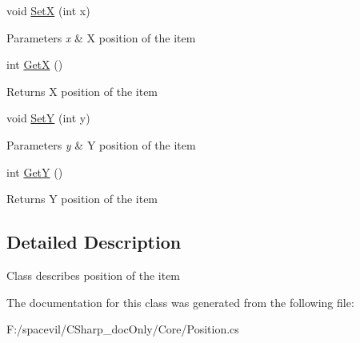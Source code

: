 \begin{DoxyCompactItemize}
\item 
\mbox{\label{class_space_v_i_l_1_1_core_1_1_position_a36efdbd80c4028b3aaff4a289e6fccbf}} 
void \mbox{\hyperlink{class_space_v_i_l_1_1_core_1_1_position_a36efdbd80c4028b3aaff4a289e6fccbf}{SetX}} (int x)
\begin{DoxyCompactList}\small\item\em 
\begin{DoxyParams}{Parameters}
{\em x} & X position of the item \\
\hline
\end{DoxyParams}
\end{DoxyCompactList}\item 
\mbox{\label{class_space_v_i_l_1_1_core_1_1_position_a3233aa0f692ff65e3d930e2e25fc1832}} 
int \mbox{\hyperlink{class_space_v_i_l_1_1_core_1_1_position_a3233aa0f692ff65e3d930e2e25fc1832}{GetX}} ()
\begin{DoxyCompactList}\small\item\em \begin{DoxyReturn}{Returns}
X position of the item 
\end{DoxyReturn}
\end{DoxyCompactList}\item 
\mbox{\label{class_space_v_i_l_1_1_core_1_1_position_a014b1cf241575d54429f92c730d66199}} 
void \mbox{\hyperlink{class_space_v_i_l_1_1_core_1_1_position_a014b1cf241575d54429f92c730d66199}{SetY}} (int y)
\begin{DoxyCompactList}\small\item\em 
\begin{DoxyParams}{Parameters}
{\em y} & Y position of the item \\
\hline
\end{DoxyParams}
\end{DoxyCompactList}\item 
\mbox{\label{class_space_v_i_l_1_1_core_1_1_position_aa1fec9620d358e197516fc6e81938a9f}} 
int \mbox{\hyperlink{class_space_v_i_l_1_1_core_1_1_position_aa1fec9620d358e197516fc6e81938a9f}{GetY}} ()
\begin{DoxyCompactList}\small\item\em \begin{DoxyReturn}{Returns}
Y position of the item 
\end{DoxyReturn}
\end{DoxyCompactList}\end{DoxyCompactItemize}


\subsection{Detailed Description}
Class describes position of the item 



The documentation for this class was generated from the following file\+:\begin{DoxyCompactItemize}
\item 
F\+:/spacevil/\+C\+Sharp\+\_\+doc\+Only/\+Core/Position.\+cs\end{DoxyCompactItemize}
